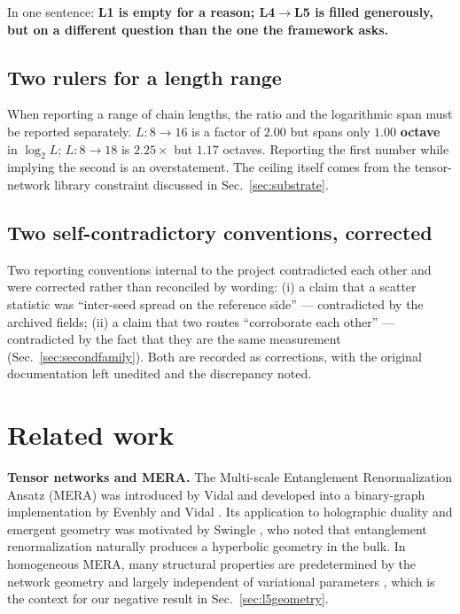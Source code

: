 \documentclass[11pt,a4paper]{article}
\begin{document}
\noindent In one sentence: \textbf{L1 is empty for a reason; L4$\to$L5 is filled
generously, but on a different question than the one the framework asks.}

\subsection{Two rulers for a length range}
\label{sec:tworulers}

When reporting a range of chain lengths, the ratio and the logarithmic span must be
reported separately. $L: 8 \to 16$ is a factor of $2.00$ but spans only
$\mathbf{1.00}$ \textbf{octave} in $\log_2 L$; $L: 8 \to 18$ is $2.25\times$ but
$1.17$ octaves. Reporting the first number while implying the second is an
overstatement. The ceiling itself comes from the tensor-network library constraint
discussed in Sec.~\ref{sec:substrate}.

\subsection{Two self-contradictory conventions, corrected}

Two reporting conventions internal to the project contradicted each other and were
corrected rather than reconciled by wording: (i) a claim that a scatter statistic
was ``inter-seed spread on the reference side'' --- contradicted by the archived
fields; (ii) a claim that two routes ``corroborate each other'' --- contradicted by
the fact that they are the same measurement (Sec.~\ref{sec:secondfamily}). Both are
recorded as corrections, with the original documentation left unedited and the
discrepancy noted.

\section{Related work}
\label{sec:related}

\textbf{Tensor networks and MERA.} The Multi-scale Entanglement Renormalization
Ansatz (MERA) was introduced by Vidal \cite{Vidal2007} and developed into a
binary-graph implementation by Evenbly and Vidal \cite{EvenblyVidal2009}. Its
application to holographic duality and emergent geometry was motivated by Swingle
\cite{Swingle2012}, who noted that entanglement renormalization naturally produces
a hyperbolic geometry in the bulk. In homogeneous MERA, many structural properties
are predetermined by the network geometry and largely independent of variational
parameters \cite{EvenblyVidal2011}, which is the context for our negative result
in Sec.~\ref{sec:l5geometry}.
\end{document}
